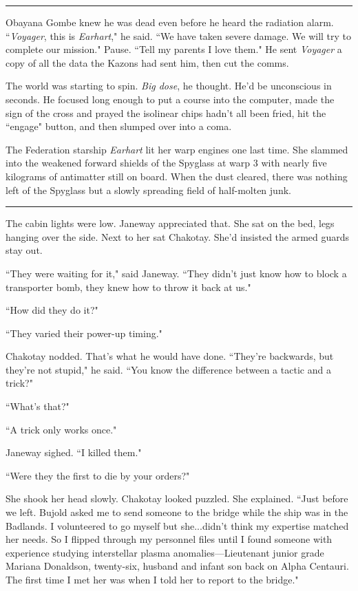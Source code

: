 \documentclass[twoside,letterpaper,12pt]{memoir}
\begin{document}
\fancybreak{\rule{3cm}{0.4 pt}}
Obayana Gombe knew he was dead even before he heard the radiation alarm. ``\textit{Voyager}, this is \textit{Earhart}," he said. ``We have taken severe damage. We will try to complete our mission." Pause. ``Tell my parents I love them." He sent \textit{Voyager} a copy of all the data the Kazons had sent him, then cut the comms.

The world was starting to spin. \textit{Big dose}, he thought. He'd be unconscious in seconds. He focused long enough to put a course into the computer, made the sign of the cross and prayed the isolinear chips hadn't all been fried, hit the ``engage" button, and then slumped over into a coma.

The Federation starship \textit{Earhart} lit her warp engines one last time. She slammed into the weakened forward shields of the Spyglass at warp 3 with nearly five kilograms of antimatter still on board. When the dust cleared, there was nothing left of the Spyglass but a slowly spreading field of half-molten junk.

\fancybreak{\rule{3cm}{0.4 pt}}
The cabin lights were low. Janeway appreciated that. She sat on the bed, legs hanging over the side. Next to her sat Chakotay. She'd insisted the armed guards stay out.

``They were waiting for it," said Janeway. ``They didn't just know how to block a transporter bomb, they knew how to throw it back at us."

``How did they do it?"

``They varied their power-up timing."

Chakotay nodded. That's what he would have done. ``They're backwards, but they're not stupid," he said. ``You know the difference between a tactic and a trick?"

``What's that?"

``A trick only works once."

Janeway sighed. ``I killed them."

``Were they the first to die by your orders?"

She shook her head slowly. Chakotay looked puzzled. She explained. ``Just before we left. Bujold asked me to send someone to the bridge while the ship was in the Badlands. I volunteered to go myself but she...didn't think my expertise matched her needs. So I flipped through my personnel files until I found someone with experience studying interstellar plasma anomalies—Lieutenant junior grade Mariana Donaldson, twenty-six, husband and infant son back on Alpha Centauri. The first time I met her was when I told her to report to the bridge."
\end{document}
